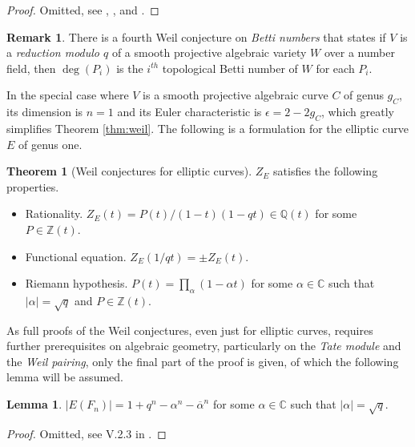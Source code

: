 \documentclass{article}
\newcommand{\Z}{\mathbb{Z}}
\newcommand{\Q}{\mathbb{Q}}
\newcommand{\C}{\mathbb{C}}
\newcommand{\rb}[1]{\left( #1 \right)}
\newcommand{\abs}[1]{\left\lvert #1 \right\rvert}
\theoremstyle{definition}
\newtheorem*{remark}{Remark}
\newtheorem{lemma}[proposition]{Lemma}
\newtheorem{theorem}[proposition]{Theorem}
\begin{document}
\begin{proof}
Omitted, see \cite{weil1}, \cite{weil2}, and \cite{weil3}.
\end{proof}

\pagebreak

\begin{remark}
There is a fourth Weil conjecture on \emph{Betti numbers} that states if $ V $ is a \emph{reduction modulo $ q $} of a smooth projective algebraic variety $ W $ over a number field, then $ \deg\rb{P_i} $ is the $ i^{th} $ topological Betti number of $ W $ for each $ P_i $.
\end{remark}

In the special case where $ V $ is a smooth projective algebraic curve $ C $ of genus $ g_C $, its dimension is $ n = 1 $ and its Euler characteristic is $ \epsilon = 2 - 2g_C $, which greatly simplifies Theorem \ref{thm:weil}. The following is a formulation for the elliptic curve $ E $ of genus one.

\begin{theorem}[Weil conjectures for elliptic curves]
\label{thm:weilcurve}
$ Z_E $ satisfies the following properties.
\begin{itemize}
\item Rationality. $ Z_E\rb{t} = P\rb{t} / \rb{1 - t}\rb{1 - qt} \in \Q\rb{t} $ for some $ P \in \Z\rb{t} $.
\item Functional equation. $ Z_E\rb{1 / qt} = \pm Z_E\rb{t} $.
\item Riemann hypothesis. $ P\rb{t} = \prod_\alpha \rb{1 - \alpha t} $ for some $ \alpha \in \C $ such that $ \abs{\alpha} = \sqrt{q} $ and $ P \in \Z\rb{t} $.
\end{itemize}
\end{theorem}

As full proofs of the Weil conjectures, even just for elliptic curves, requires further prerequisites on algebraic geometry, particularly on the \emph{Tate module} and the \emph{Weil pairing}, only the final part of the proof is given, of which the following lemma will be assumed.

\begin{lemma}
$ \abs{E\rb{F_n}} = 1 + q^n - \alpha^n - \overline{\alpha}^n $ for some $ \alpha \in \C $ such that $ \abs{\alpha} = \sqrt{q} $.
\end{lemma}

\begin{proof}
Omitted, see V.2.3 in \cite{gtm}.
\end{proof}
\end{document}
